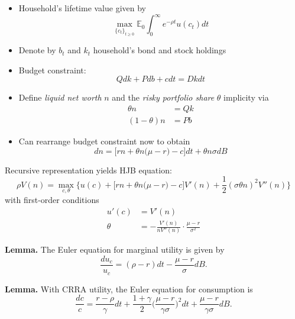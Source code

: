\documentclass[10pt]{beamer}
\begin{document}
\begin{frame}{}
\begin{itemize}
\item Household's lifetime value given by
\begin{equation*}
	\max_{ \{c_t\}_{t \geq 0} } \mathbb E_0 \int_0^\infty e^{- \rho t} u(c_t) dt
\end{equation*}

\item Denote by $b_t$ and $k_t$ household's bond and stock holdings

\item Budget constraint:
\begin{equation*}
	Q dk + P db + c dt = D k dt
\end{equation*}

\item Define \textit{liquid net worth} $n$ and the \textit{risky portfolio share} $\theta$ implicity via 
\begin{align*}
	\theta n &= Q k \\
	(1-\theta) n &= Pb
\end{align*}

\item Can rearrange budget constraint now to obtain 
\begin{equation*}
	dn = \bigg[ r n + \theta n \Big( \mu - r \Big) - c \bigg] dt + \theta n \sigma dB
\end{equation*}

\end{itemize}
\end{frame}


\begin{frame}{}
Recursive representation yields HJB equation:
\begin{equation*}
	\rho V(n) = \max_{c, \theta} \Big\{ u(c) + \Big[ r n + \theta n \Big( \mu - r \Big) - c \Big] V'(n) + \frac{1}{2} (\sigma \theta n)^2 V''(n) \Big\}
\end{equation*}
with first-order conditions
\begin{align*}
	u'(c) &= V'(n) \\
	\theta &= - \frac{V'(n)}{n V''(n)} \cdot \frac{\mu - r}{\sigma^2}
\end{align*}

\vspace{5mm}
\textbf{Lemma.} The Euler equation for marginal utility is given by
\begin{equation*}
	\frac{du_c}{u_c} = (\rho - r) dt - \frac{\mu - r}{\sigma} dB.
\end{equation*}


\vspace{5mm}
\textbf{Lemma.} With CRRA utility, the Euler equation for consumption is
\begin{equation*}
	\frac{dc}{c} = \frac{r - \rho}{\gamma} dt + \frac{1+\gamma}{2} \bigg( \frac{\mu - r}{\gamma \sigma} \bigg)^2 dt + \frac{\mu - r}{\gamma \sigma} dB.
\end{equation*}
\end{frame}
\end{document}
